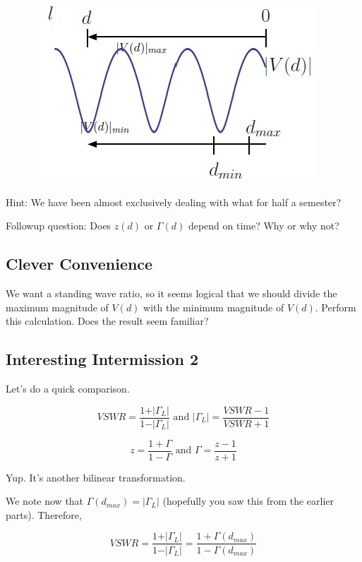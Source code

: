 \documentclass{article}
\begin{document}
\begin{figure}[h]
\begin{center}
    \includegraphics[width= 0.5
    \textwidth]{figures/Standing Wave Ratio.jpg}
\end{center}
\end{figure}

Hint: We have been almost exclusively dealing with what for half a semester?

Followup question: Does $z(d)$ or $\Gamma(d)$ depend on time? Why or why not?

\newpage

\subsection{Clever Convenience}

We want a standing wave ratio, so it seems logical that we should divide the maximum magnitude of $V(d)$ with the minimum magnitude of $V(d)$. Perform this calculation. Does the result seem familiar?

\vspace{4cm}

\subsection{Interesting Intermission 2}

Let's do a quick comparison.

$$VSWR = \frac{1 + \vert \Gamma_L \vert}{1 - \vert \Gamma_L \vert} \text{ and } \vert \Gamma_L \vert = \frac{VSWR - 1}{VSWR + 1}$$

$$z = \frac{1 + \Gamma}{1 - \Gamma} \text{ and } \Gamma = \frac{z - 1}{z + 1}$$

Yup. It's another bilinear transformation.

We note now that $\Gamma(d_{max}) = \vert \Gamma_L \vert$ (hopefully you saw this from the earlier parts). Therefore,

$$VSWR = \frac{1 + \vert \Gamma_L \vert}{1 - \vert \Gamma_L \vert} = \frac{1 + \Gamma(d_{max})}{1 - \Gamma(d_{max})}$$
\end{document}
